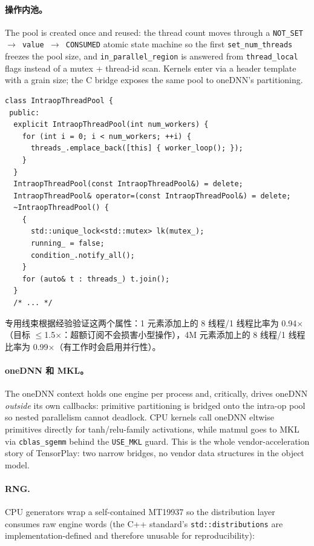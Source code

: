\paragraph{操作内池。} The pool is created once and reused: the thread count moves through a \texttt{NOT\_SET $\rightarrow$ value $\rightarrow$ CONSUMED} atomic state machine so the first \texttt{set\_num\_threads} freezes the pool size, and \texttt{in\_parallel\_region} is answered from \texttt{thread\_local} flags instead of a mutex + thread-id scan. Kernels enter via a header template with a grain size; the C bridge exposes the same pool to oneDNN's partitioning.

\begin{lstlisting}[caption={The whole pool is one class: spawn workers once, drain on shutdown.}, label=lst:pool]
class IntraopThreadPool {
 public:
  explicit IntraopThreadPool(int num_workers) {
    for (int i = 0; i < num_workers; ++i) {
      threads_.emplace_back([this] { worker_loop(); });
    }
  }
  IntraopThreadPool(const IntraopThreadPool&) = delete;
  IntraopThreadPool& operator=(const IntraopThreadPool&) = delete;
  ~IntraopThreadPool() {
    {
      std::unique_lock<std::mutex> lk(mutex_);
      running_ = false;
      condition_.notify_all();
    }
    for (auto& t : threads_) t.join();
  }
  /* ... */
\end{lstlisting}

专用线束根据经验验证这两个属性：1 元素添加上的 8 线程/1 线程比率为 0.94$\times$（目标 $\le$1.5$\times$：超额订阅不会损害小型操作），4M 元素添加上的 8 线程/1 线程比率为 0.99$\times$（有工作时会启用并行性）。

\paragraph{oneDNN 和 MKL。} The oneDNN context holds one engine per process and, critically, drives oneDNN \emph{outside} its own callbacks: primitive partitioning is bridged onto the intra-op pool so nested parallelism cannot deadlock. CPU kernels call oneDNN eltwise primitives directly for tanh/relu-family activations, while matmul goes to MKL via \texttt{cblas\_sgemm} behind the \texttt{USE\_MKL} guard. This is the whole vendor-acceleration story of TensorPlay: two narrow bridges, no vendor data structures in the object model.

\paragraph{RNG.} CPU generators wrap a self-contained MT19937 so the distribution layer consumes raw engine words (the C++ standard's \texttt{std::distributions} are implementation-defined and therefore unusable for reproducibility):

